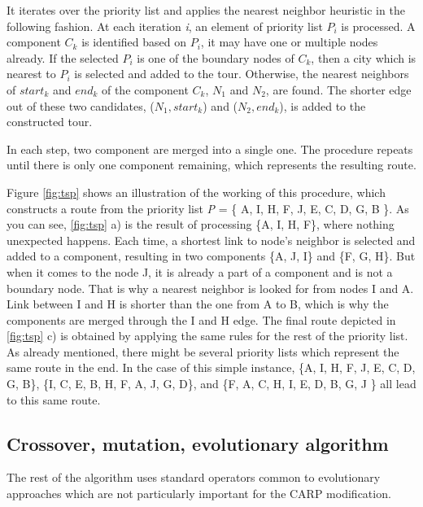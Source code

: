 \documentclass[twoside]{ctuthesis}
\theoremstyle{plain}
\theoremstyle{definition}
\theoremstyle{note}
\begin{document}
It iterates over the priority list and applies the nearest neighbor heuristic in the following fashion. At each iteration \emph{i}, an element of priority list \emph{$ P_i $} is processed. A component \emph{$ C_k $} is identified based on \emph{$ P_i $}, it may have one or multiple nodes already. If the selected \emph{$ P_i $} is one of the boundary nodes of \emph{$ C_k $}, then a city which is nearest to \emph{$ P_i $} is selected and added to the tour. Otherwise, the nearest neighbors of \emph{$ start_k $} and \emph{$ end_k $} of the component \emph{$ C_k $}, \emph{$ N_1 $} and \emph{$ N_2 $}, are found.
The shorter edge out of these two candidates, (\emph{$ N_1, start_k $}) and (\emph{$ N_2, end_k $}), is added to the constructed tour. 

In each step, two component are merged into a single one. The procedure repeats until there is only one component remaining, which represents the resulting route.

Figure \ref{fig:tsp} shows an illustration of the working of this procedure, which constructs a route from the priority list \emph{P} = \{ A, I, H, F, J, E, C, D, G, B \}. As you can see, \ref{fig:tsp} a) is the result of processing \{A, I, H, F\}, where nothing unexpected happens. Each time, a shortest link to node's neighbor is selected and added to a component, resulting in two components \{A, J, I\} and \{F, G, H\}. But when it comes to the node J, it is already a part of a component and is not a boundary node. That is why a nearest neighbor is looked for from nodes I and A. Link between I and H is shorter than the one from A to B, which is why the components are merged through the I and H edge. The final route depicted in \ref{fig:tsp} c) is obtained by applying the same rules for the rest of the priority list.
As already mentioned, there might be several priority lists which represent the same route in the end. In the case of this simple instance,  \{A, I, H, F, J, E, C, D, G, B\}, \{I, C, E, B, H, F, A, J, G, D\}, and \{F, A, C, H, I, E, D, B, G, J \} all lead to this same route. 

\subsection{Crossover, mutation, evolutionary algorithm}
The rest of the algorithm uses standard operators common to evolutionary approaches which are not particularly important for the CARP modification.
\end{document}
